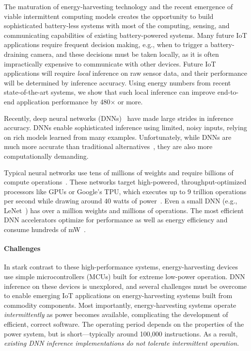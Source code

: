 The maturation of energy-harvesting technology and the recent
emergence of viable intermittent computing models creates the
opportunity to build sophisticated battery-less systems with most of
the computing, sensing, and communicating capabilities of existing
battery-powered systems.
%
Many future IoT applications require frequent decision making, e.g.,
when to trigger a battery-draining camera,
%
and these decisions must be taken locally,
as it is often impractically expensive %
to communicate with other devices.
%
Future IoT applications will require {\em local} inference on raw sensor data,
and their performance will be determined by inference accuracy. Using energy
numbers from recent state-of-the-art systems, we show that such local inference
can improve end-to-end application performance by 480$\times$ or more.

Recently, deep neural networks (DNNs)~\cite{alexnet, vgg, googlenet} have made
large strides in inference accuracy.
%
DNNs enable sophisticated inference using limited, noisy inputs, relying on
rich models learned from many examples.
%
Unfortunately, while DNNs are much more accurate than traditional
alternatives~\cite{gupta2017protonn, Mitchell:1997:ML:541177}, they are also
more computationally demanding.

Typical neural networks use tens of millions of weights and require
billions of compute operations~\cite{vgg,googlenet,alexnet}.
%
These networks target high-powered,
throughput-optimized processors like GPUs or Google's TPU, which
executes up to 9 trillion operations per second while drawing around
40 watts of power~\cite{jouppi:isca17:tpu}.
%
Even a small DNN (e.g., LeNet~\cite{lecun:ieee89:lenet}) has over a million
weights and millions of operations.
%
The most efficient DNN accelerators optimize for performance as
well as energy efficiency and consume hundreds of
mW~\cite{han:isca16:eie,chen:asplos14:diannao,du:isca15:shidiannao,chen:isca16:eyeriss}.

\paragraph{Challenges}
%
In stark contrast to these high-performance systems, energy-harvesting devices
use simple microcontrollers (MCUs) built for extreme low-power operation.
% 
DNN inference on these devices is unexplored, and several challenges
must be overcome to enable emerging IoT applications on
energy-harvesting systems built from commodity components.
%
Most importantly, energy-harvesting systems operate
\emph{intermittently} as power becomes available, complicating the
development of efficient, correct software.
%
The operating period depends on the properties of the
power system, but is short---typically around 100,000 instructions.
%
As a result, \emph{existing DNN inference implementations do not tolerate 
  intermittent operation}.

